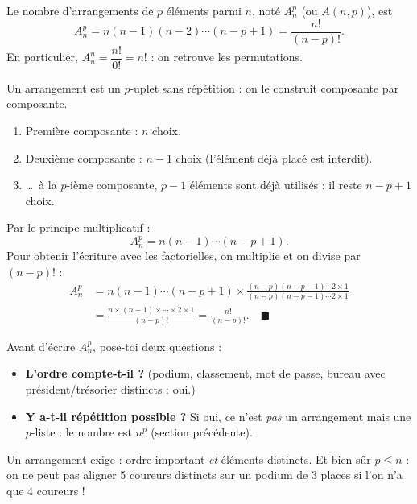 \documentclass[11pt]{article}
\begin{document}
\begin{propriete}
Le nombre d'arrangements de $p$ éléments parmi $n$, noté $A_n^p$ (ou $A(n,p)$), est
\[ A_n^p = n(n-1)(n-2)\cdots(n-p+1) = \frac{n!}{(n-p)!}. \]
En particulier, $A_n^n = \dfrac{n!}{0!} = n!$ : on retrouve les permutations.
\end{propriete}

\begin{experience}
Un arrangement est un $p$-uplet sans répétition : on le construit composante par composante.
\begin{enumerate}
\item Première composante : $n$ choix.
\item Deuxième composante : $n-1$ choix (l'élément déjà placé est interdit).
\item \ldots\ à la $p$-ième composante, $p-1$ éléments sont déjà utilisés : il reste $n-p+1$ choix.
\end{enumerate}
Par le principe multiplicatif :
\[ A_n^p = n(n-1)\cdots(n-p+1). \]
Pour obtenir l'écriture avec les factorielles, on multiplie et on divise par $(n-p)!$ :
\begin{align*}
A_n^p &= n(n-1)\cdots(n-p+1)\times \frac{(n-p)(n-p-1)\cdots 2\times 1}{(n-p)(n-p-1)\cdots 2\times 1} \\
&= \frac{n\times(n-1)\times\cdots\times 2\times 1}{(n-p)!} = \frac{n!}{(n-p)!}. \quad \blacksquare
\end{align*}
\end{experience}

\begin{attention}
Avant d'écrire $A_n^p$, pose-toi deux questions :
\begin{itemize}
\item \textbf{L'ordre compte-t-il ?} (podium, classement, mot de passe, bureau avec président/trésorier distincts : oui.)
\item \textbf{Y a-t-il répétition possible ?} Si oui, ce n'est \emph{pas} un arrangement mais une $p$-liste : le nombre est $n^p$ (section précédente).
\end{itemize}
Un arrangement exige : ordre important \emph{et} éléments distincts. Et bien sûr $p \leq n$ : on ne peut pas aligner 5 coureurs distincts sur un podium de 3 places si l'on n'a que 4 coureurs !
\end{attention}
\end{document}
